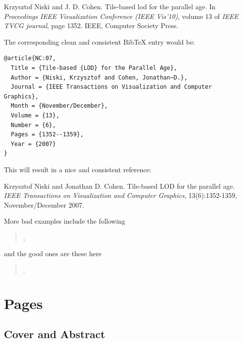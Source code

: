 \documentclass[11pt, a4paper,oneside,chapterprefix=false]{scrbook}
\begin{document}
\smallskip
\noindent
[NC] Krzysztof Niski and J. D. Cohen. Tile-based lod for the parallel age. In \emph{Proceedings IEEE Visualization Conference (IEEE Vis'10)}, volume 13 of \emph{IEEE TVCG journal}, page 1352. IEEE, Computer Society Press.

\bigskip
\noindent
The corresponding clean and consistent BibTeX entry would be:

\begin{verbatim}
@article{NC:07,
  Title = {Tile-based {LOD} for the Parallel Age},
  Author = {Niski, Krzysztof and Cohen, Jonathan~D.},
  Journal = {IEEE Transactions on Visualization and Computer Graphics},
  Month = {November/December},
  Volume = {13},
  Number = {6},
  Pages = {1352--1359},
  Year = {2007}
}
\end{verbatim}

\noindent
This will result in a nice and consistent reference:

\smallskip
\noindent
[NC07]  Krzysztof Niski and Jonathan D. Cohen. Tile-based LOD for the parallel age. \emph{IEEE Transactions on Visualization and Computer Graphics}, 13(6):1352-1359, November/December 2007.

\vspace{5mm}
More bad examples include the following
\begin{quotation}
\cite{HWH:10bad,Suss:10bad,HXS:09bad,CH:09bad,Strugar:10bad,Fout:07bad,WGS:07bad,CMF:05bad,AGLMR:02bad,Koltun:00bad,CYHPK:97bad}, 
\end{quotation}

and the good ones are these here
\begin{quotation}
\cite{HWH:10,SWF:10,HXS:09,CH:09,Strugar:10,FM:07,WGS:07,CMF:05,AGLMR:02,KCC:00,CYHPK:97}.
\end{quotation}


\chapter*{Pages}


\section*{Cover and Abstract}
\end{document}
